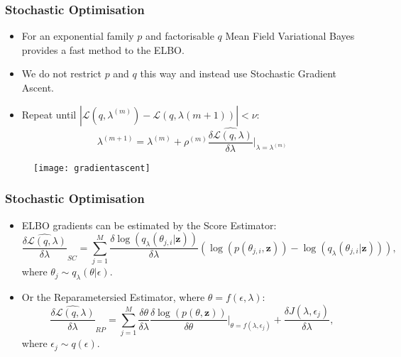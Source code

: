 \documentclass[11pt]{beamer}\usepackage[]{graphicx}\usepackage[]{color}
\begin{document}
\begin{frame}
\frametitle{Stochastic Optimisation}
\begin{itemize}
\item For an exponential family $p$ and factorisable $q$ Mean Field Variational Bayes provides a fast method to the ELBO. 
\item We do not restrict $p$ and $q$ this way and instead use Stochastic Gradient Ascent.
\item Repeat until $| \mathcal{L}(q, \lambda^{(m)}) - \mathcal{L}(q, \lambda{(m+1)})| < \nu$:
\begin{equation}
\label{gradientAscent}
\lambda^{(m+1)} = \lambda^{(m)} + \rho^{(m)} \widehat{\frac{\delta\mathcal{L}(q, \lambda)}{\delta \lambda}} \bigg\rvert_{\lambda = \lambda^{(m)}}
\end{equation}
\end{itemize}
\begin{figure}
\centering
\texttt{[image: gradientascent]}
\end{figure}
\end{frame}

\begin{frame}
\frametitle{Stochastic Optimisation}
\begin{itemize}
\item ELBO gradients can be estimated by the Score Estimator:
\begin{equation}
\label{scoreDeriv}
\widehat{\frac{\delta\mathcal{L}(q, \lambda)}{\delta \lambda}}_{SC} = \sum_{j = 1}^M \frac{\delta \log(q_{\lambda}(\theta_{j, i} | \textbf{z}))}{\delta \lambda} \left(\log(p(\theta_{j, i}, \textbf{z})) - \log(q_{\lambda}(\theta_{j, i} | \textbf{z})) \right),
\end{equation}
where $\theta_j \sim q_{\lambda}(\theta | \epsilon)$.
\item Or the Reparametersied Estimator, where $\theta = f(\epsilon, \lambda)$:
\begin{equation}
\label{rpDeriv}
\widehat{\frac{\delta\mathcal{L}(q, \lambda)}{\delta \lambda}}_{RP} = \sum_{j = 1}^M \frac{\delta \theta}{\delta \lambda} \frac{\delta \log(p(\theta, \textbf{z}))}{\delta \theta} \bigg\rvert_{\theta = f(\lambda, \epsilon_j)} + \frac{\delta J(\lambda, \epsilon_j)}{\delta \lambda}, 
\end{equation}
where $\epsilon_j \sim q(\epsilon)$.
\end{itemize}
\end{frame}
\end{document}
